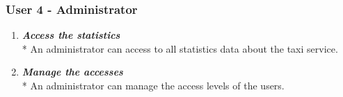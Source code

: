 \subsubsection{User 4 - Administrator}
\begin{enumerate}
\item \textit{\textbf{Access the statistics}}\\*
An administrator can access to all statistics data about the taxi service.
\item \textit{\textbf{Manage the accesses}}\\*
An administrator can manage the access levels of the users.
\end{enumerate}